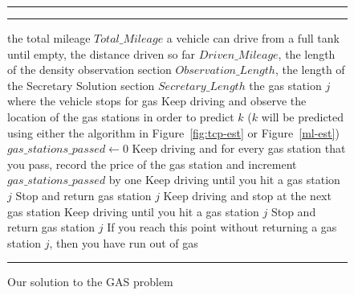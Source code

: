 \begin{figure}[!hbt]
\vspace{0.2cm}
\hrule \medskip {} \smallskip
\hrule
\smallskip
\begin{algorithmic}[1]
 the total mileage $Total\_Mileage$ a vehicle can drive from a full tank until empty, the distance driven so far $Driven\_Mileage$, the length of the density observation section $Observation\_Length$, the length of the Secretary Solution section $Secretary\_Length$
 the gas station $j$ where the vehicle stops for gas
\STATE Keep driving and observe the location of the gas stations in order to predict $k$ ($k$ will be predicted using either the algorithm in Figure~\ref{fig:tcp-est} or Figure~\ref{ml-est})
\ENDWHILE \\
$gas\_stations\_passed \gets 0$
\STATE Keep driving and for every gas station that you pass, record the price of the gas station and increment $gas\_stations\_passed$ by one
\ENDWHILE
{}
\STATE Keep driving until you hit a gas station $j$
\STATE Stop and return gas station $j$
\ELSE
\STATE Keep driving and stop at the next gas station
\ENDIF
\ENDWHILE
{}
\STATE Keep driving until you hit a gas station $j$
\STATE Stop and return gas station $j$
\ENDWHILE
\STATE If you reach this point without returning a gas station $j$, then you have run out of gas
\end{algorithmic}
\hrule
\caption{Our solution to the GAS problem}
\label{fig:CriticalSectionsAlg}
\end{figure}
